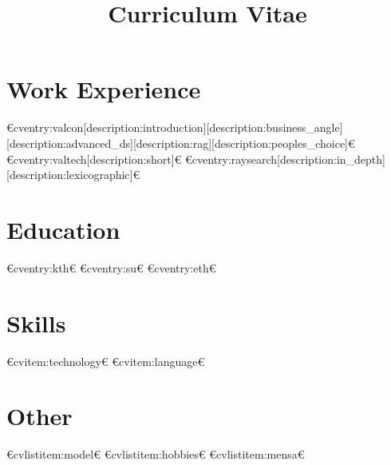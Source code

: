 
\title{Curriculum Vitae}



\newcommand{\role}{Senior Manager, Machine Learning Engineer}
\newcommand{\company}{Novo Holdings}



  \makecvtitle

  \section{Work Experience}
  €cventry:valcon[description:introduction][description:business_angle][description:advanced_ds][description:rag][description:peoples_choice]€
  €cventry:valtech[description:short]€
  €cventry:raysearch[description:in_depth][description:lexicographic]€

  \section{Education}
  €cventry:kth€
  €cventry:su€
  €cventry:eth€

  \section{Skills}
  €cvitem:technology€
  €cvitem:language€

  \section{Other}
  €cvlistitem:model€
  €cvlistitem:hobbies€
  €cvlistitem:mensa€
